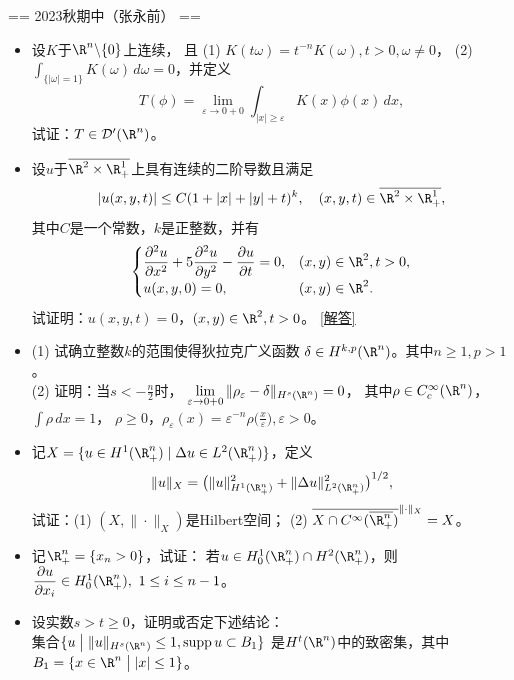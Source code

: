 == 2023秋期中（张永前） ==

\begin{itemize}
    \item[一] 设$K$于$\R^n\backslash\{0\}$上连续，
    且 (1) $K(t\omega)=t^{-n}K(\omega),t>0,\omega\ne0$，
    (2) $\displaystyle\int_{\{|\omega|=1\}}K(\omega)\,d\omega=0$，并定义
    \[T(\phi)=\lim_{\varepsilon\to0+0}
    \int_{|x|\ge\varepsilon}K(x)\phi(x)\,dx,\]
    试证：$T\in\mathcal{D}'(\R^n)$。
    \item[二] 设$u$于$\overline{\R^2\times\R^1_+}$上具有连续的二阶导数且满足
    \[|u(x,y,t)|\le C(1+|x|+|y|+t)^k,\quad(x,y,t)\in\overline{\R^2\times\R^1_+},\]
    其中$C$是一个常数，$k$是正整数，并有
    \[\begin{cases}
        \displaystyle\frac{\partial^2u}{\partial x^2}
        +5\frac{\partial^2u}{\partial y^2}
        -\frac{\partial u}{\partial t}=0,&(x,y)\in\R^2,t>0,\\
        u(x,y,0)=0,&(x,y)\in\R^2.
    \end{cases}\]
    试证明：$u(x,y,t)=0$，$(x,y)\in\R^2,t>0$。
    \href{https://mp.weixin.qq.com/s/4ID0b9EYiEzNIYo7Ifbjcg}{[解答]}
    \item[三] (1) 试确立整数$k$的范围使得狄拉克广义函数
    $\delta\in H^{k,p}(\R^n)$。其中$n\ge1,p>1$。\\
    (2) 证明：当$s<-\frac{n}{2}$时，
    $\lim\limits_{\varepsilon\to0+0}\|\rho_\varepsilon-\delta\|_{H^s(\R^n)}=0$，
    其中$\rho\in C_c^\infty(\R^n)$，$\int\rho\,dx=1$，
    $\rho\ge0$，$\rho_\varepsilon(x)=\varepsilon^{-n}
    \rho\big(\frac{x}{\varepsilon}\big),\varepsilon>0$。
    \item[四] 记$X=\{u\in H^1(\R^n_+)\mid\Delta u\in L^2(\R^n_+)\}$，定义
    \[\|u\|_X=\big(\|u\|^2_{H^1(\R^n_+)}
    +\|\Delta u\|^2_{L^2(\R^n_+)}\big)^{1/2},\]
    试证：(1) $(X,\|\cdot\|_{X})$是Hilbert空间；
    (2) $\overline{X\cap C^\infty(\overline{\R^n_+})}^{\|\cdot\|_X}=X$。
    \item[五] 记$\R^n_+=\{x_n>0\}$，试证：
    若$u\in H_0^1(\R^n_+)\cap H^2(\R^n_+)$，则
    $\dfrac{\partial u}{\partial x_i}\in H_0^1(\R^n_+),\ 1\le i\le n-1$。
    \item[六] 设实数$s>t\ge0$，证明或否定下述结论：\\
    集合$\{u\bigm|\|u\|_{H^s(\R^n)}\le1,\operatorname{supp}u\subset B_1\}$
    是$H^t(\R^n)$中的致密集，其中$B_1=\{x\in\R^n\bigm||x|\le1\}$。
\end{itemize}

